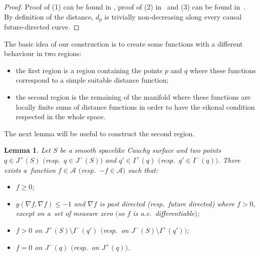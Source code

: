 \documentclass[11pt]{article}
\newtheorem{lemma}{Lemma}
\begin{document}
\begin{proof}
Proof of (1) can be found in \cite{Beem,ONeill}, proof of (2) in~\cite{EGK} and (3) can be found in~\cite{Mor}. By def\/inition of the distance, $d_p$ is trivially non-decreasing along every causal future-directed curve.
\end{proof}

The basic idea of our construction is to create some functions with a dif\/ferent behaviour in two regions:
\begin{itemize}\itemsep=0pt
\item the f\/irst region is a region containing the points $p$ and $q$ where these functions correspond to a simple suitable distance function;
\item the second region is the remaining of the manifold where these functions are locally f\/inite sums of distance functions in order to have the eikonal condition respected in the whole space.
\end{itemize}

The next lemma will be useful to construct the second region.

\begin{lemma}\label{lemmaprincipal}
Let $S$ be a smooth spacelike Cauchy surface and two points $q \in J^+(S)$ $($resp.\ $q \in J^-(S))$ and $q' \in I^+(q)$ $($resp.\ $q' \in I^-(q))$. There exists a~function $f \in \mathcal A$ $($resp.\ $-f \in \mathcal A)$ such that:
\begin{itemize}\itemsep=0pt
\item $f \geq 0 $;
\item $g( \nabla f, \nabla f ) \leq -1$ and $\nabla f$ is past directed (resp.\ future directed) where $f > 0$, except on a~set of measure zero $($so $f$ is a.e.\ differentiable$)$;
\item $f > 0$ on $J^+(S) \setminus I^-(q')$ $($resp.\ on $J^-(S) \setminus I^+(q'))$;
\item $f = 0$ on $J^-(q)$ $($resp.\ on $J^+(q))$.
\end{itemize}
\end{lemma}
\end{document}

